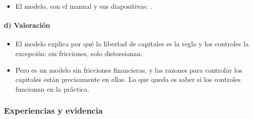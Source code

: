 \documentclass[11pt]{article}
\begin{document}
\begin{anotaciones}
\begin{itemize}
\item El modelo, con el manual y sus diapositivas: \textcite{SchmittGroheUribeWoodford2022International,Uribe2022DiapositivasControles}.
\end{itemize}
\end{anotaciones}

\paragraph{d) Valoración}

\begin{itemize}
\item El modelo explica por qué la libertad de capitales es la regla y los controles la excepción: sin fricciones, solo distorsionan.
\item Pero es un modelo sin fricciones financieras, y las razones para controlar los capitales están precisamente en ellas. Lo que queda es saber si los controles funcionan en la práctica.
\end{itemize}

\subsubsection{Experiencias y evidencia}\label{sec:controles-evidencia}
\end{document}
